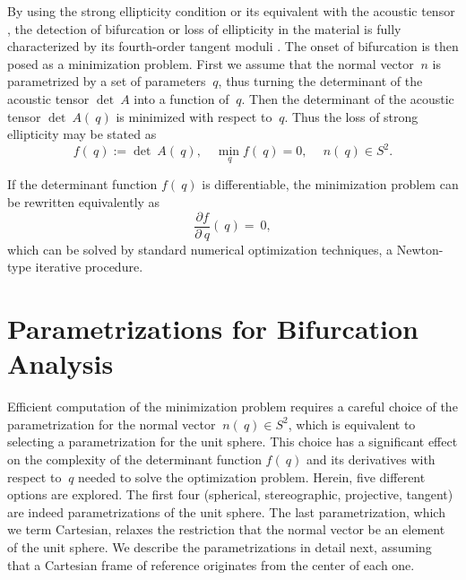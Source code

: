 \documentclass[12pt]{article}
\numberwithin{equation}{section}
\begin{document}
By using the strong ellipticity condition
 or its equivalent with the acoustic
tensor , the detection of bifurcation
or loss of ellipticity in the material is fully characterized by its
fourth-order tangent moduli . The
onset of bifurcation is then posed as a minimization problem.  First
we assume that the normal vector $~n$ is parametrized by a set of
parameters $~q$, thus turning the determinant of the acoustic tensor
$\det ~A$ into a function of $~q$.  Then the determinant of the
acoustic tensor $\det ~A(~q)$ is minimized with respect to
$~q$. Thus the loss of strong ellipticity may be stated as
\begin{equation} \label{eq:minimization-determinant}
  f(~q) := \det ~A(~q),
  \quad
  \min_{~q} f(~q) = 0,
  \quad
  ~n(~q) \in S^2.
\end{equation}

If the determinant function $f(~q)$ is differentiable, the
minimization problem can be rewritten equivalently as
\begin{equation}\label{eq:minimization-derivative}
  \frac{\partial f}{\partial ~q}(~q) = ~0,
\end{equation}
which can be solved by standard numerical optimization techniques, \eg
a Newton-type iterative procedure.

\section{Parametrizations for Bifurcation Analysis}
\label{sec:parametrizations}

Efficient computation of the minimization problem
 requires a careful choice of the
parametrization for the normal vector $~n(~q) \in S^2$, which is
equivalent to selecting a parametrization for the unit sphere. This
choice has a significant effect on the complexity of the determinant
function $f(~q)$ and its derivatives with respect to $~q$ needed to
solve the optimization problem. Herein, five different options are
explored. The first four (spherical, stereographic, projective,
tangent) are indeed parametrizations of the unit sphere.  The last
parametrization, which we term Cartesian, relaxes the restriction that
the normal vector be an element of the unit sphere. We describe the
parametrizations in detail next, assuming that a Cartesian frame of
reference originates from the center of each one.
\end{document}
